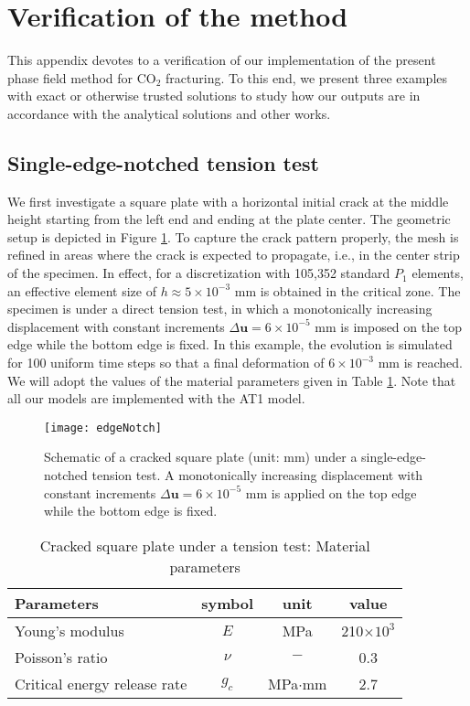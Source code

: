 \section{Verification of the method}\label{Sec:App}
This appendix devotes to a verification of our implementation of the present phase field method for CO$_2$ fracturing. To this end, we present three examples with exact or otherwise trusted solutions to study how our outputs are in accordance with the analytical solutions and other works.

\subsection{Single-edge-notched tension test}
We first investigate a square plate with a horizontal {initial} crack at the middle height starting from the left end and ending at the plate center. The geometric setup is depicted in Figure \ref{Fig:Notched_geometry}. To capture the crack pattern properly, the mesh is refined in areas where the crack is expected to propagate, i.e., in the center strip of the specimen. In effect, for a discretization with 105,352 standard $P_1$ elements, an effective element size of $h\approx 5\times 10^{-3}$ mm is obtained in the critical zone. The specimen is under a direct tension test, in which a monotonically increasing displacement with constant increments $\Delta\bm{u}=6 \times 10^{-5}$ mm is imposed on the top edge while the bottom edge is fixed. In this example, the evolution is simulated for 100 uniform time steps so that a final deformation of $6\times 10^{-3}$ mm is reached. We will adopt the values of the material parameters given in Table \ref{Tab:Notched_input}. Note that all our models are implemented with the AT1 model.
\begin{figure}[htbp]
    \centering
    \texttt{[image: edgeNotch]}
    \caption{Schematic of a cracked square plate (unit: mm) under a single-edge-notched tension test. 
    A monotonically increasing displacement with constant increments $\Delta\bm{u}=6\times 10^{-5}$ mm is applied on the top edge while the bottom edge is fixed.}
    \label{Fig:Notched_geometry}
\end{figure}

\begin{table}[htbp]
    \centering
    \caption{Cracked square plate under a tension test: Material parameters \cite{ambati2015review}}
    \begin{tabular}{l c c c}
    \hline 
         Parameters & symbol & unit& value \\
    \hline 
         Young's modulus & $E$ &MPa&  210$\times 10^{3}$\\
         Poisson's ratio & $\nu$ &$-$&  0.3\\
         Critical energy release rate & $g_c$ &MPa$\cdot$mm&  2.7\\
            \hline      
    \end{tabular}
    \label{Tab:Notched_input}
\end{table}

